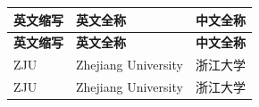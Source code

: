 \cleardoublepage
{}

\begin{center}
    \begin{longtable}{m{2cm}m{8cm}m{5cm}}
        \toprule
        \textbf{英文缩写}&\textbf{英文全称}&\textbf{中文全称}\\
        \midrule
        \endfirsthead
        \toprule
        \textbf{英文缩写}&\textbf{英文全称}&\textbf{中文全称}\\
        \midrule
        \endhead 
        \bottomrule
        \endfoot
        \bottomrule
        \endlastfoot
        ZJU           & Zhejiang University & 浙江大学          \\
        ZJU           & Zhejiang University & 浙江大学          \\
	\end{longtable}
\end{center}
